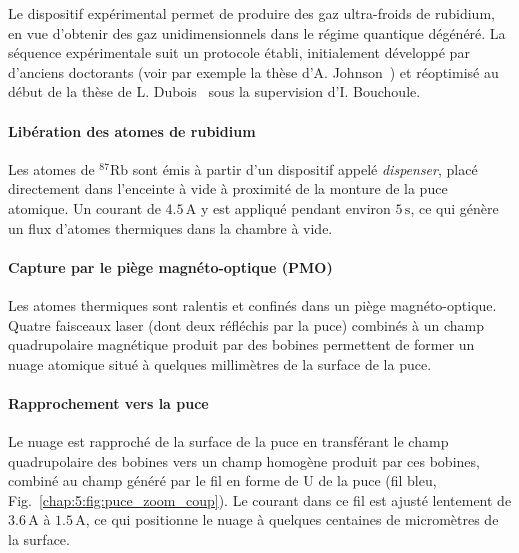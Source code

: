 Le dispositif expérimental permet de produire des gaz ultra-froids de rubidium, en vue d’obtenir des gaz unidimensionnels dans le régime quantique dégénéré. La séquence expérimentale suit un protocole établi, initialement développé par d’anciens doctorants (voir par exemple la thèse d’A. Johnson~\cite{Johnson2016}) et réoptimisé au début de la thèse de L. Dubois~\cite{L.Dubois2024} sous la supervision d’I. Bouchoule.


\paragraph{Libération des atomes de rubidium}
Les atomes de $^{87}$Rb sont émis à partir d’un dispositif appelé \emph{dispenser}, placé directement dans l’enceinte à vide à proximité de la monture de la puce atomique. Un courant de \( 4.5\,\mathrm{A} \) y est appliqué pendant environ \( 5\,\mathrm{s} \), ce qui génère un flux d’atomes thermiques dans la chambre à vide.

\paragraph{Capture par le piège magnéto-optique (\gls{PMO})}
Les atomes thermiques sont ralentis et confinés dans un piège magnéto-optique. Quatre faisceaux laser (dont deux réfléchis par la puce) combinés à un champ quadrupolaire magnétique produit par des bobines permettent de former un nuage atomique situé à quelques millimètres de la surface de la puce.


\paragraph{Rapprochement vers la puce}
Le nuage est rapproché de la surface de la puce en transférant le champ quadrupolaire des bobines vers un champ homogène produit par ces bobines, combiné au champ généré par le fil en forme de U de la puce (fil bleu, Fig.~\ref{chap:5:fig:puce_zoom_coup}). Le courant dans ce fil est ajusté lentement de \(3.6\,\mathrm{A}\) à \(1.5\,\mathrm{A}\), ce qui positionne le nuage à quelques centaines de micromètres de la surface.

